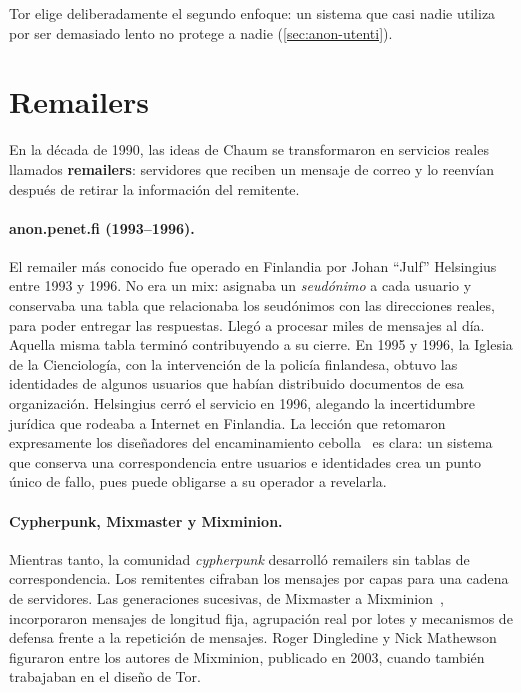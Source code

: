 Tor elige deliberadamente el segundo enfoque: un sistema que casi nadie utiliza por ser demasiado lento no protege a nadie (\cref{sec:anon-utenti}).

\section{Remailers}\label{sec:radici-remailer}

En la década de 1990, las ideas de Chaum se transformaron en servicios reales llamados \textbf{remailers}: servidores que reciben un mensaje de correo y lo reenvían después de retirar la información del remitente.

\paragraph{anon.penet.fi (1993--1996).} El remailer más conocido fue operado en Finlandia por Johan \enquote{Julf} Helsingius entre 1993 y 1996. No era un mix: asignaba un \emph{seudónimo} a cada usuario y conservaba una tabla que relacionaba los seudónimos con las direcciones reales, para poder entregar las respuestas. Llegó a procesar miles de mensajes al día. Aquella misma tabla terminó contribuyendo a su cierre. En 1995 y 1996, la Iglesia de la Cienciología, con la intervención de la policía finlandesa, obtuvo las identidades de algunos usuarios que habían distribuido documentos de esa organización. Helsingius cerró el servicio en 1996, alegando la incertidumbre jurídica que rodeaba a Internet en Finlandia. La lección que retomaron expresamente los diseñadores del encaminamiento cebolla~\cite{syverson2011peel} es clara: un sistema que conserva una correspondencia entre usuarios e identidades crea un punto único de fallo, pues puede obligarse a su operador a revelarla.

\paragraph{Cypherpunk, Mixmaster y Mixminion.} Mientras tanto, la comunidad \emph{cypherpunk} desarrolló remailers sin tablas de correspondencia. Los remitentes cifraban los mensajes por capas para una cadena de servidores. Las generaciones sucesivas, de Mixmaster a Mixminion~\cite{danezis2003mixminion}, incorporaron mensajes de longitud fija, agrupación real por lotes y mecanismos de defensa frente a la repetición de mensajes. Roger Dingledine y Nick Mathewson figuraron entre los autores de Mixminion, publicado en 2003, cuando también trabajaban en el diseño de Tor.

